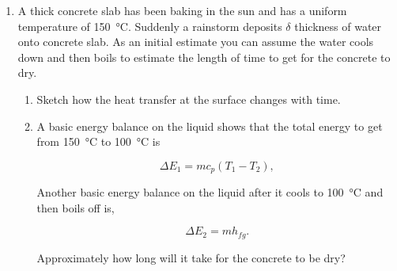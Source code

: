 \documentclass[12pt,letterpaper]{article}
\begin{document}
\begin{enumerate}
    \item A thick concrete slab has been baking in the sun and has a uniform temperature of \SI{150}{\celsius}.
        Suddenly a rainstorm deposits $\delta$ thickness of water onto concrete slab.
        As an initial estimate you can assume the water cools down and then boils to estimate the length of time to get for the concrete to dry.
        
    \begin{enumerate}
        \item Sketch how the heat transfer at the surface changes with time.
        \item A basic energy balance on the liquid shows that the total energy to get from \SI{150}{\celsius} to \SI{100}{\celsius} is

        \begin{equation*}
            \Delta E_1 = m c_p (T_1 - T_2),
        \end{equation*}

        Another basic energy balance on the liquid after it cools to \SI{100}{\celsius} and then boils off is,

        \begin{equation*}
            \Delta E_2 = m h_{fg}.
        \end{equation*}
        
        Approximately how long will it take for the concrete to be dry?
    \end{enumerate}
    \newpage

    

\end{enumerate}
\end{document}
